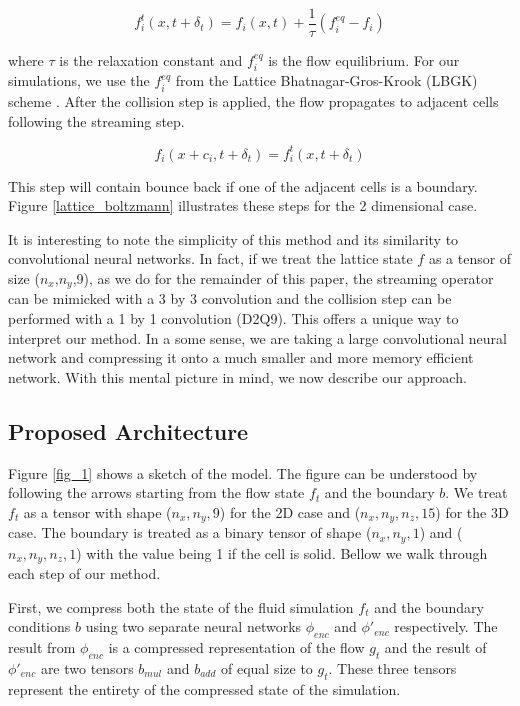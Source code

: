 \documentclass{article}
\begin{document}
\begin{equation}
  f^t_i(x, t + \delta_t) = f_i(x,t) + \frac{1}{\tau} (f_i^{eq} - f_i)
\end{equation}

where $\tau$ is the relaxation constant and $f_i^{eq}$ is the flow equilibrium. For our simulations, we use the $f_i^{eq}$ from the Lattice Bhatnagar-Gros-Krook (LBGK) scheme \cite{guo2013lattice}. After the collision step is applied, the flow propagates to adjacent cells following the streaming step. 

\begin{equation}
  f_i(x + c_i, t + \delta_t) = f^t_i(x,t + \delta_t)
\end{equation}

This step will contain bounce back if one of the adjacent cells is a boundary. Figure \ref{lattice_boltzmann} illustrates these steps for the 2 dimensional case.

It is interesting to note the simplicity of this method and its similarity to convolutional neural networks. In fact, if we treat the lattice state $f$ as a tensor of size ($n_x$,$n_y$,9), as we do for the remainder of this paper, the streaming operator can be mimicked with a 3 by 3 convolution and the collision step can be performed with a 1 by 1 convolution (D2Q9). This offers a unique way to interpret our method. In a some sense, we are taking a large convolutional neural network and compressing it onto a much smaller and more memory efficient network. With this mental picture in mind, we now describe our approach.

\subsection{Proposed Architecture}

Figure \ref{fig_1} shows a sketch of the model. The figure can be understood by following the arrows starting from the flow state $f_t$ and the boundary $b$. We treat $f_t$ as a tensor with shape ($n_x,n_y,9$) for the 2D case and ($n_x,n_y,n_z,15$) for the 3D case. The boundary is treated as a binary tensor of shape ($n_x,n_y,1$) and ($n_x,n_y,n_z,1$) with the value being 1 if the cell is solid. Bellow we walk through each step of our method.

First, we compress both the state of the fluid simulation $f_t$ and the boundary conditions $b$ using two separate neural networks $\phi_{enc}$ and $\phi'_{enc}$ respectively. The result from $\phi_{enc}$ is a compressed representation of the flow $g_t$ and the result of $\phi'_{enc}$ are two tensors $b_{mul}$ and $b_{add}$ of equal size to $g_t$. These three tensors represent the entirety of the compressed state of the simulation.
\end{document}
